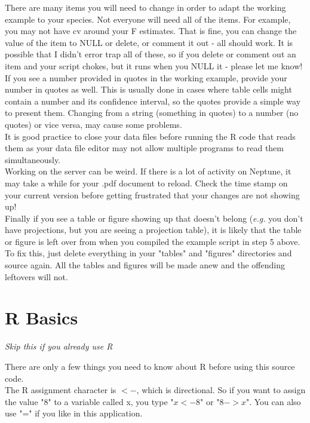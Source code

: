 \documentclass[]{report}
\begin{document}
There are many items you will need to change in order to adapt the working example to your species.  Not everyone will need all of the items.  For example, you may not have cv around your F estimates.  That is fine, you can change the value of the item to NULL or delete, or comment it out - all should work. It is possible that I didn't error trap all of these, so if you delete or comment out an item and your script chokes, but it runs when you NULL it - please let me know!\\  

If you see a number provided in quotes in the working example, provide your number in quotes as well.  This is usually done in cases where table cells might contain a number and its confidence interval, so the quotes provide a simple way to present them.  Changing from a string (something in quotes) to a number (no quotes) or vice versa, may cause some problems.\\

It is good practice to close your data files before running the R code that reads them as your data file editor may not allow multiple programs to read them simultaneously. \\ 

Working on the server can be weird.  If there is a lot of activity on Neptune, it may take a while for your .pdf document to reload.  Check the time stamp on your current version before getting frustrated that your changes are not showing up!\\

Finally if you see a table or figure showing up that doesn't belong (\textit{e.g.} you don't have projections, but you are seeing a projection table), it is likely that the table or figure is left over from when you compiled the example script in step 5 above.  To fix this, just delete everything in your "tables" and "figures" directories and source again.  All the tables and figures will be made anew and the offending leftovers will not.

\section*{R Basics}
\textit{Skip this if you already use R}

There are only a few things you need to know about R before using this source code.  \\

The R assignment character is $<-$, which is directional.  So if you want to assign the value "8" to a variable called x, you type "$x<-8$" or "$8->x$".  You can also use "=" if you like in this application.  \\  
\end{document}
